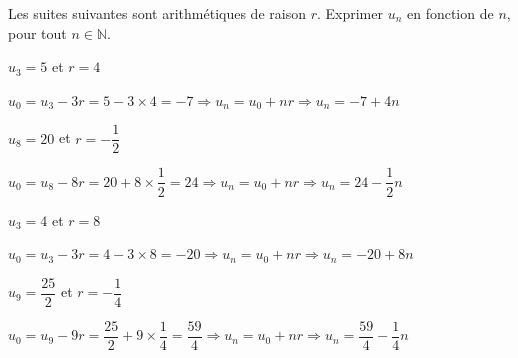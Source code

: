 \documentclass[12pt,a4paper]{article}  %
\begin{document}
Les suites suivantes sont arithmétiques de raison $r$. Exprimer $u_{n}$ en fonction de $n$, pour tout $n \in \mathbb{N}$.
\begin{enumMet}
    \item $u_{3}=5$ et $r=4$\\
    \begin{corrBox}
        $u_0=u_3-3r=5-3\times4=-7\Longrightarrow u_n=u_0+nr \Longrightarrow u_n=-7+4n$
    \end{corrBox}
    \item $u_{8}=20$ et $r=-\dfrac{1}{2}$\\
    \begin{corrBox}
        $u_0=u_8-8r=20+8\times\dfrac{1}{2}=24\Longrightarrow u_n=u_0+nr \Longrightarrow u_n=24-\dfrac{1}{2}n$
    \end{corrBox}
    \item {} $u_{3}=4$ et $r=8$\\
    \begin{corrBox}
        $u_0=u_3-3r=4-3\times8=-20\Longrightarrow u_n=u_0+nr \Longrightarrow u_n=-20+8n$
    \end{corrBox}
    \item $u_{9}=\dfrac{25}{2}$ et $r=-\dfrac{1}{4}$\\
    \begin{corrBox}
        $u_0=u_9-9r=\dfrac{25}{2}+9\times\dfrac{1}{4}=\dfrac{59}{4}\Longrightarrow u_n=u_0+nr \Longrightarrow u_n=\dfrac{59}{4}-\dfrac{1}{4}n$
    \end{corrBox}
\end{enumMet}
\end{document}

